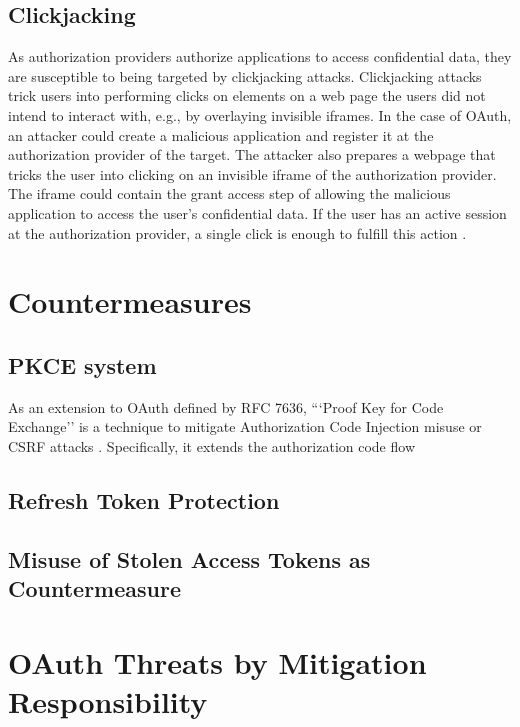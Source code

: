 \documentclass[
    fontsize=12pt,
    headings=small,
    parskip=half,           %
    bibliography=totoc,
    numbers=noenddot,       %
    open=any,               %
    ]{scrreprt}
\begin{document}
\subsection{Clickjacking}
As authorization providers authorize applications to access confidential data, they are susceptible to being targeted by clickjacking attacks. Clickjacking attacks trick users into performing clicks on elements on a web page the users did not intend to interact with, e.g., by overlaying invisible iframes. In the case of OAuth, an attacker could create a malicious application and register it at the authorization provider of the target. The attacker also prepares a webpage that tricks the user into clicking on an invisible iframe of the authorization provider. The iframe could contain the grant access step of allowing the malicious application to access the user's confidential data. If the user has an active session at the authorization provider, a single click is enough to fulfill this action \cite{gibbons2014security}. 


\section{Countermeasures}
\subsection{PKCE system}
As an extension to OAuth defined by RFC 7636, ```Proof Key for Code Exchange''
is a technique to mitigate Authorization Code Injection misuse or CSRF attacks
\cite{bradley2015rfc}. Specifically, it extends the authorization code flow 

\subsection{Refresh Token Protection}

\subsection{Misuse of Stolen Access Tokens as Countermeasure}

\section{OAuth Threats by Mitigation Responsibility}
\end{document}
